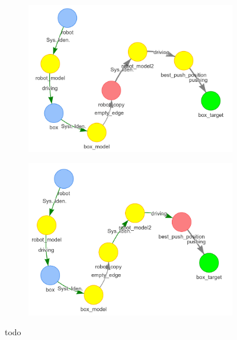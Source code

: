 \begin{figure}[H]
    \begin{subfigure}{.3\textwidth}
    \centering
    \includegraphics[width=1\textwidth]{figures/proposed_method/connecting_nodes/robot_push/robot_push_7}
    \caption{}\label{subfig:robot_push_7}
    \end{subfigure}
    \begin{subfigure}{.3\textwidth}
    \centering
    \includegraphics[width=1.05\textwidth]{figures/proposed_method/connecting_nodes/robot_push/robot_push_8}
    \caption{}\label{subfig:robot_push_8}
    \end{subfigure}
    \caption{todo}%
    \label{fig:robot_push_3}
\end{figure}




